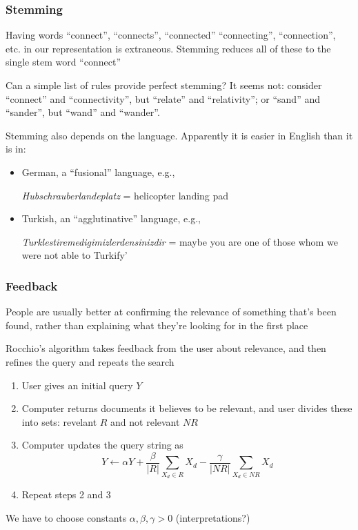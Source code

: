 \documentclass[mathserif]{beamer}
\def\red{\color[rgb]{0.8,0,0}}
\begin{document}
\begin{frame}
\frametitle{Stemming}
Having words ``connect'', ``connects'', ``connected''
``connecting'', ``connection'', etc. in our representation
is extraneous. {\red Stemming} reduces
all of these to the single stem word ``connect''

\bigskip
Can a simple list of rules provide perfect stemming? {\red
It seems not}: consider ``connect'' and ``connectivity'',
but ``relate'' and ``relativity''; or ``sand'' and ``sander'',
but ``wand'' and ``wander''.

\bigskip
Stemming also {\red depends on the language}. Apparently 
it is easier in English than it is in:
\begin{itemize}
\item German, a ``fusional'' language, e.g., 
\begin{center}
{\it Hubschrauberlandeplatz} = helicopter landing pad
\end{center}
\item Turkish, an ``agglutinative'' language, e.g.,
\begin{center}
{\it Turklestiremedigimizlerdensinizdir} = 
maybe you are one of those whom we were not able to 
Turkify'
\end{center}
\end{itemize}

\end{frame}

\begin{frame}
\frametitle{Feedback}
People are usually better at {\red confirming the 
relevance} of something that's been found, rather 
than explaining what they're looking for in the 
first place

\bigskip
{\red Rocchio's algorithm} takes 
feedback from the user about relevance, and then
refines the query and repeats the search
\begin{enumerate}
\item User gives an initial query $Y$
\item Computer returns documents it believes
to be relevant, and user divides these into sets:
revelant $R$ and not relevant $NR$
\item Computer updates the query string as
$$Y \leftarrow \alpha Y + 
\frac{\beta}{|R|} \sum_{X_d \in R} X_d -
\frac{\gamma}{|NR|} \sum_{X_d \in NR} X_d$$
\item Repeat steps 2 and 3
\end{enumerate}
We have to choose constants $\alpha,\beta,\gamma>0$
(interpretations?)

\end{frame}
\end{document}
